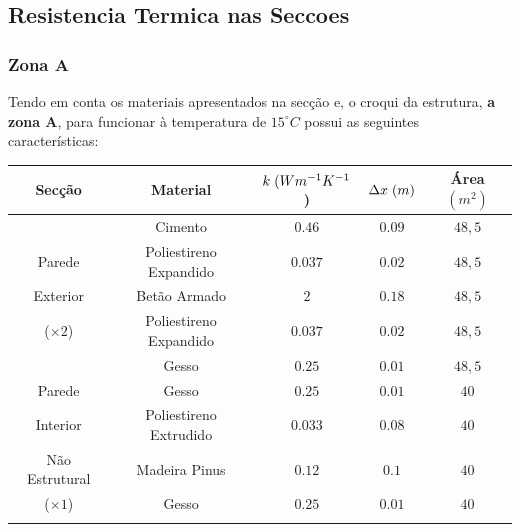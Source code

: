 \documentclass[12pt, a4paper]{article}
\begin{document}


\subsection{Resistencia Termica nas Seccoes}\label{sub:Resistencia Termica nas Seccoes}

\subsubsection{Zona A}\label{ssub:zonaa}

Tendo em conta os materiais apresentados na secção e, o croqui da estrutura, \textbf{a zona A}, para funcionar
à temperatura de $ 15^\circ C $ possui as seguintes características:

\begin{table}[htpb]
	\begin{center}
		\begin{tabular}{c c c c c}
			\toprule{}
			Secção                     & Material               & $ k \hspace{1mm} (Wm^{-1}K^{-1}$) & $ \Delta x \hspace{1mm} (m)$ & Área $(m^2) $ \\
				\midrule{}

			\multirow{5}{*}{}          & Cimento                & $0.46$                            & $0.09$                       & $48,5$          \\
				\cline{2-5}
			Parede                     & Poliestireno Expandido & $0.037$                           & $0.02$                       & $48,5$          \\
				\cline{2-5}
			Exterior                   & Betão Armado           & $2$                               & $0.18$                       & $48,5$          \\
				\cline{2-5}
			($\times 2$)               & Poliestireno Expandido & $0.037$                           & $0.02$                       & $48,5$          \\
				\cline{2-5}
			                           & Gesso                  & $0.25$                            & $0.01$                       & $48,5$          \\
				\midrule{}

			Parede \multirow{4}{*}{}   & Gesso                  & $0.25$                            & $0.01$                       & $40$          \\
				\cline{2-5}
			Interior                   & Poliestireno Extrudido & $0.033$                           & $0.08$                       & $40$          \\
				\cline{2-5}
			Não Estrutural             & Madeira Pinus          & $0.12$                            & $0.1$                        & $40$          \\
				\cline{2-5}
			($\times 1$)               & Gesso                  & $0.25$                            & $0.01$                       & $40$          \\
				\midrule{}


\end{tabular}
\end{center}
\end{table}
\end{document}
